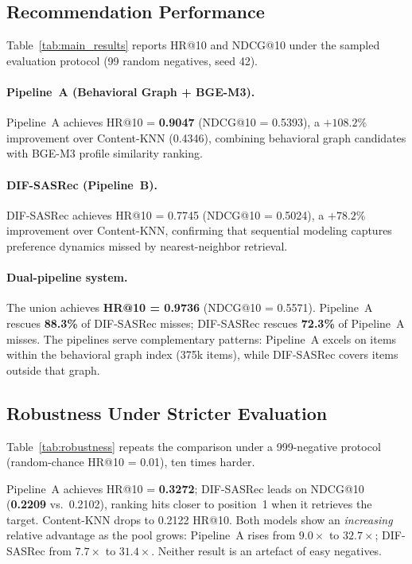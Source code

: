 \subsection{Recommendation Performance}
Table~\ref{tab:main_results} reports HR@10 and NDCG@10 under the
sampled evaluation protocol (99 random negatives, seed 42).



\paragraph{Pipeline~A (Behavioral Graph + BGE-M3).}
Pipeline~A achieves HR@10 = \textbf{0.9047} (NDCG@10 = 0.5393), a
$+108.2\%$ improvement over Content-KNN (0.4346), combining behavioral
graph candidates with BGE-M3 profile similarity ranking.

\paragraph{DIF-SASRec (Pipeline~B).}
DIF-SASRec achieves HR@10 = 0.7745 (NDCG@10 = 0.5024), a $+78.2\%$
improvement over Content-KNN, confirming that sequential modeling captures
preference dynamics missed by nearest-neighbor retrieval.

\paragraph{Dual-pipeline system.}
The union achieves \textbf{HR@10 = 0.9736} (NDCG@10 = 0.5571).
Pipeline~A rescues \textbf{88.3\%} of DIF-SASRec misses; DIF-SASRec rescues
\textbf{72.3\%} of Pipeline~A misses.
The pipelines serve complementary patterns: Pipeline~A excels on items within
the behavioral graph index (375k items), while DIF-SASRec covers items outside that graph.



\subsection{Robustness Under Stricter Evaluation}
\label{ssec:robustness}

Table~\ref{tab:robustness} repeats the comparison under a 999-negative
protocol (random-chance HR@10 = 0.01), ten times harder.



Pipeline~A achieves HR@10 = \textbf{0.3272}; DIF-SASRec leads on NDCG@10
(\textbf{0.2209} vs.\ 0.2102), ranking hits closer to position~1 when it
retrieves the target. Content-KNN drops to 0.2122 HR@10.
Both models show an \emph{increasing} relative advantage as the pool grows:
Pipeline~A rises from $9.0\times$ to $32.7\times$; DIF-SASRec from $7.7\times$
to $31.4\times$. Neither result is an artefact of easy negatives.

